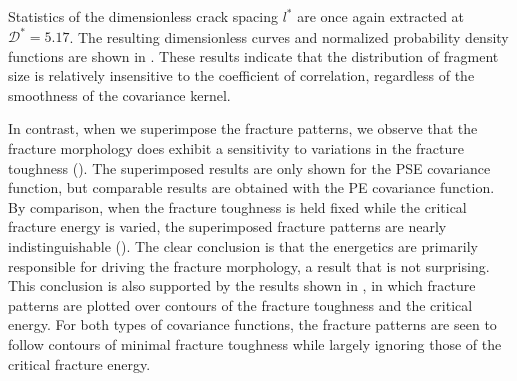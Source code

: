 

Statistics of the dimensionless crack spacing $l^*$ are once again extracted at $\mathcal{D}^* = 5.17$. The resulting dimensionless curves and normalized probability density functions are shown in . These results indicate that the distribution of fragment size is relatively insensitive to the coefficient of correlation, regardless of the smoothness of the covariance kernel.



In contrast, when we superimpose the fracture patterns, we observe that the fracture morphology does exhibit a sensitivity to variations in the fracture toughness  (). The superimposed results are only shown for the PSE covariance function, but comparable results are obtained with the PE covariance function.
By comparison, when the fracture toughness is held fixed while the critical fracture energy is varied, the superimposed fracture patterns are nearly indistinguishable (). The clear conclusion is that the energetics are primarily responsible for driving the fracture morphology, a result that is not surprising. This conclusion is also supported by the results shown in , in which fracture patterns are plotted over contours of the fracture toughness and the critical energy. For both types of covariance functions, the fracture patterns are seen to follow contours of minimal fracture toughness while largely ignoring those of the critical fracture energy.





